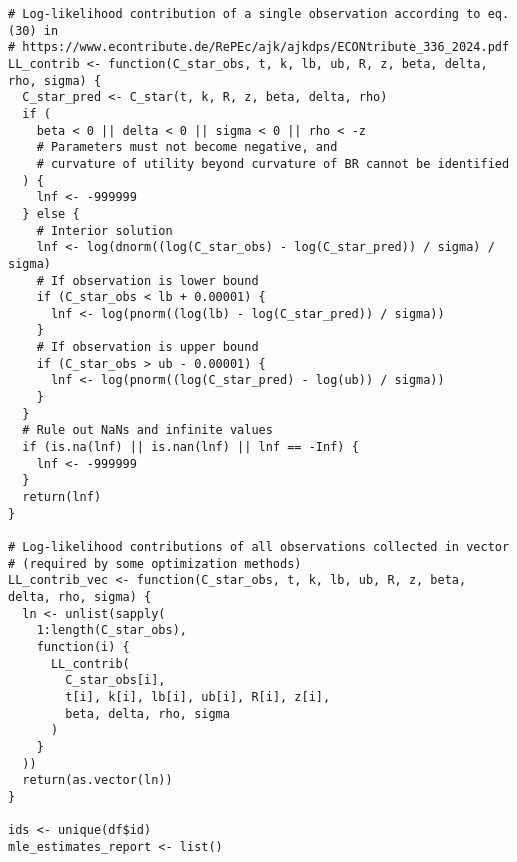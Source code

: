 \documentclass[12pt, a4paper, oneside]{article}
\theoremstyle{Plain}
\theoremstyle{Definition}
\theoremstyle{Remark}
\begin{document}
\begin{appendix}
\begin{lstlisting}
# Log-likelihood contribution of a single observation according to eq. (30) in
# https://www.econtribute.de/RePEc/ajk/ajkdps/ECONtribute_336_2024.pdf
LL_contrib <- function(C_star_obs, t, k, lb, ub, R, z, beta, delta, rho, sigma) {
  C_star_pred <- C_star(t, k, R, z, beta, delta, rho)
  if (
    beta < 0 || delta < 0 || sigma < 0 || rho < -z
    # Parameters must not become negative, and
    # curvature of utility beyond curvature of BR cannot be identified
  ) {
    lnf <- -999999
  } else {
    # Interior solution
    lnf <- log(dnorm((log(C_star_obs) - log(C_star_pred)) / sigma) / sigma)
    # If observation is lower bound
    if (C_star_obs < lb + 0.00001) {
      lnf <- log(pnorm((log(lb) - log(C_star_pred)) / sigma))
    }
    # If observation is upper bound
    if (C_star_obs > ub - 0.00001) {
      lnf <- log(pnorm((log(C_star_pred) - log(ub)) / sigma))
    }
  }
  # Rule out NaNs and infinite values
  if (is.na(lnf) || is.nan(lnf) || lnf == -Inf) {
    lnf <- -999999
  }
  return(lnf)
}

# Log-likelihood contributions of all observations collected in vector
# (required by some optimization methods)
LL_contrib_vec <- function(C_star_obs, t, k, lb, ub, R, z, beta, delta, rho, sigma) {
  ln <- unlist(sapply(
    1:length(C_star_obs),
    function(i) {
      LL_contrib(
        C_star_obs[i],
        t[i], k[i], lb[i], ub[i], R[i], z[i],
        beta, delta, rho, sigma
      )
    }
  ))
  return(as.vector(ln))
}

ids <- unique(df$id)
mle_estimates_report <- list()


\end{lstlisting}
\end{appendix}
\end{document}

